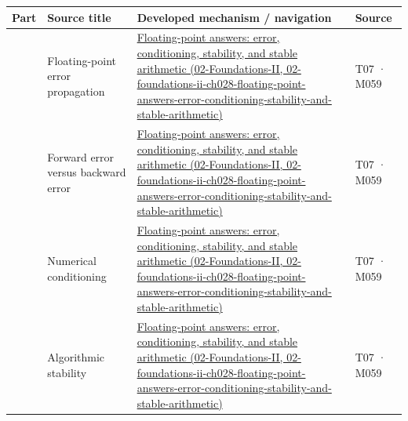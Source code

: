 {\def\LTcaptype{none} %
\begin{longtable}[]{@{}
  >{\raggedleft\arraybackslash}p{}
  >{\raggedright\arraybackslash}p{}
  >{\raggedright\arraybackslash}p{}
  >{\raggedright\arraybackslash}p{}@{}}
\toprule\noalign{}
\begin{minipage}[b]{\linewidth}\raggedleft
Part
\end{minipage} & \begin{minipage}[b]{\linewidth}\raggedright
Source title
\end{minipage} & \begin{minipage}[b]{\linewidth}\raggedright
Developed mechanism / navigation
\end{minipage} & \begin{minipage}[b]{\linewidth}\raggedright
Source
\end{minipage} \\
\midrule\noalign{}
\endhead
\bottomrule\noalign{}
\endlastfoot
966 & Floating-point error propagation & \href{../02-Foundations-II/main.pdf\#nameddest=02-foundations-ii-ch028-floating-point-answers-error-conditioning-stability-and-stable-arithmetic}{Floating-point answers: error, conditioning, stability, and stable arithmetic (02-Foundations-II, 02-foundations-ii-ch028-floating-point-answers-error-conditioning-stability-and-stable-arithmetic)} & T07 · M059 \\
967 & Forward error versus backward error & \href{../02-Foundations-II/main.pdf\#nameddest=02-foundations-ii-ch028-floating-point-answers-error-conditioning-stability-and-stable-arithmetic}{Floating-point answers: error, conditioning, stability, and stable arithmetic (02-Foundations-II, 02-foundations-ii-ch028-floating-point-answers-error-conditioning-stability-and-stable-arithmetic)} & T07 · M059 \\
968 & Numerical conditioning & \href{../02-Foundations-II/main.pdf\#nameddest=02-foundations-ii-ch028-floating-point-answers-error-conditioning-stability-and-stable-arithmetic}{Floating-point answers: error, conditioning, stability, and stable arithmetic (02-Foundations-II, 02-foundations-ii-ch028-floating-point-answers-error-conditioning-stability-and-stable-arithmetic)} & T07 · M059 \\
969 & Algorithmic stability & \href{../02-Foundations-II/main.pdf\#nameddest=02-foundations-ii-ch028-floating-point-answers-error-conditioning-stability-and-stable-arithmetic}{Floating-point answers: error, conditioning, stability, and stable arithmetic (02-Foundations-II, 02-foundations-ii-ch028-floating-point-answers-error-conditioning-stability-and-stable-arithmetic)} & T07 · M059 \\

\end{longtable}}

